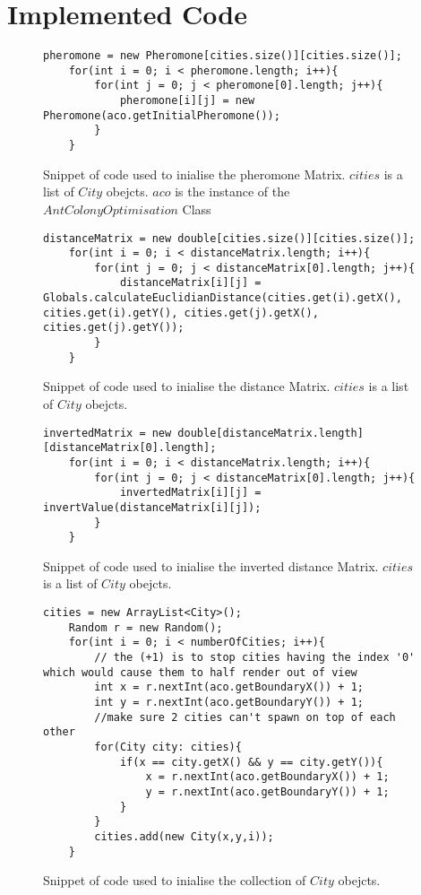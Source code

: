 \chapter{Implemented Code}
\renewcommand{\thechapter}{\Alph{chapter}}

\begin{figure}[H]
\begin{lstlisting}
pheromone = new Pheromone[cities.size()][cities.size()];
	for(int i = 0; i < pheromone.length; i++){
		for(int j = 0; j < pheromone[0].length; j++){
			pheromone[i][j] = new Pheromone(aco.getInitialPheromone());
		}
	}
\end{lstlisting}
\caption{Snippet of code used to inialise the pheromone Matrix. $cities$ is a list of $City$ obejcts. $aco$ is the instance of the $AntColonyOptimisation$ Class}
\label{initPheroCode}
\end{figure}

\begin{figure}[H]
\begin{lstlisting}
distanceMatrix = new double[cities.size()][cities.size()];
	for(int i = 0; i < distanceMatrix.length; i++){
		for(int j = 0; j < distanceMatrix[0].length; j++){
			distanceMatrix[i][j] = Globals.calculateEuclidianDistance(cities.get(i).getX(), cities.get(i).getY(), cities.get(j).getX(), cities.get(j).getY());
		}
	}
\end{lstlisting}
\caption{Snippet of code used to inialise the distance Matrix. $cities$ is a list of $City$ obejcts.}
\label{initDistanceCode}
\end{figure}

\begin{figure}[H]
\begin{lstlisting}
invertedMatrix = new double[distanceMatrix.length][distanceMatrix[0].length];	
	for(int i = 0; i < distanceMatrix.length; i++){
		for(int j = 0; j < distanceMatrix[0].length; j++){
			invertedMatrix[i][j] = invertValue(distanceMatrix[i][j]);
		}
	}
\end{lstlisting}
\caption{Snippet of code used to inialise the inverted distance Matrix. $cities$ is a list of $City$ obejcts.}
\label{initInverteddistanceCode}
\end{figure}

\begin{figure}[H]
\begin{lstlisting}
cities = new ArrayList<City>();
	Random r = new Random();
	for(int i = 0; i < numberOfCities; i++){
		// the (+1) is to stop cities having the index '0' which would cause them to half render out of view
		int x = r.nextInt(aco.getBoundaryX()) + 1;
		int y = r.nextInt(aco.getBoundaryY()) + 1;
		//make sure 2 cities can't spawn on top of each other
		for(City city: cities){
			if(x == city.getX() && y == city.getY()){
				x = r.nextInt(aco.getBoundaryX()) + 1;
				y = r.nextInt(aco.getBoundaryY()) + 1;
			}
		}
		cities.add(new City(x,y,i));	
	}
\end{lstlisting}
\caption{Snippet of code used to inialise the collection of $City$ obejcts.}
\label{initCity}
\end{figure}

